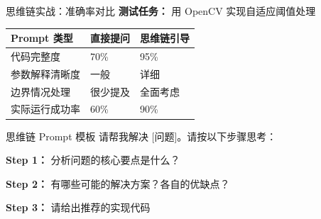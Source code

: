 \begin{frame}{思维链实战：准确率对比}
	\textbf{测试任务：} 用 OpenCV 实现自适应阈值处理

	\vspace{0.3cm}

	\begin{table}
		\centering
		\begin{tabular}{p{3cm}p{4cm}p{4cm}}
			\toprule
			\textbf{Prompt 类型} & \textbf{直接提问} & \textbf{思维链引导} \\
			\midrule
			代码完整度              & 70\%          & 95\%           \\
			参数解释清晰度            & 一般            & 详细             \\
			边界情况处理             & 很少提及          & 全面考虑           \\
			实际运行成功率            & 60\%          & 90\%           \\
			\bottomrule
		\end{tabular}
	\end{table}

	\vspace{0.3cm}

	\begin{exampleblock}{思维链 Prompt 模板}
		请帮我解决 [问题]。请按以下步骤思考：

		\textbf{Step 1：} 分析问题的核心要点是什么？

		\textbf{Step 2：} 有哪些可能的解决方案？各自的优缺点？

		\textbf{Step 3：} 请给出推荐的实现代码
	\end{exampleblock}
\end{frame}


